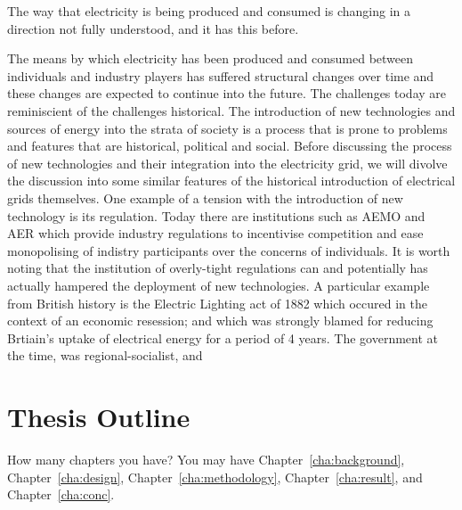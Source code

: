 The way that electricity is being produced and consumed is changing in a direction not fully understood, and it has this before.

The means by which electricity has been produced and consumed between individuals and industry players has suffered structural changes over time and these changes are expected to continue into the future.
The challenges today are reminiscient of the challenges historical.
The introduction of new technologies and sources of energy into the strata of society is a process that is prone to problems and features that are historical, political and social.
Before discussing the process of new technologies and their integration into the electricity grid, we will divolve the discussion into some similar features of the historical introduction of electrical grids themselves.
One example of a tension with the introduction of new technology is its regulation.
Today there are institutions such as AEMO and AER which provide industry regulations to incentivise competition and ease monopolising of indistry participants over the concerns of individuals.
It is worth noting that the institution of overly-tight regulations can and potentially has actually hampered the deployment of new technologies.
A particular example from British history is the Electric Lighting act of 1882 which occured in the context of an economic resession; and which was strongly blamed for reducing Brtiain's uptake of electrical energy for a period of 4 years.
The government at the time, was regional-socialist, and



\section{Thesis Outline}
\label{sec:outline}
How many chapters you have? You may have Chapter~\ref{cha:background},
Chapter~\ref{cha:design}, Chapter~\ref{cha:methodology},
Chapter~\ref{cha:result}, and Chapter~\ref{cha:conc}.
